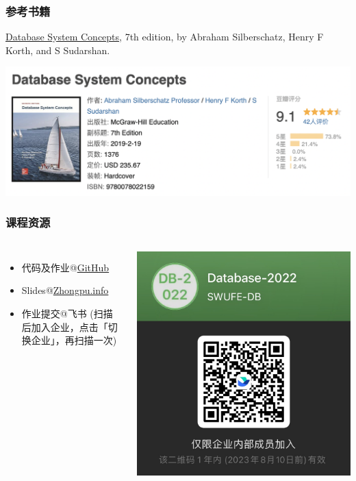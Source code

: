 \documentclass[aspectratio=169, 14pt]{beamer}
\begin{document}
\begin{frame}
    \frametitle{参考书籍}
    \href{https://book.douban.com/subject/30345517/}{Database System Concepts}, 7th edition, by Abraham Silberschatz, Henry F Korth, and S Sudarshan.
    \begin{center}
        \includegraphics[height=.5\paperheight]{image/dsc-book}
    \end{center}
\end{frame}

\begin{frame}
    \frametitle{课程资源}
    \begin{columns}
        \begin{itemize}
            \item 代码及作业@\href{https://github.com/ChenZhongPu/db-swufe}{GitHub}
            \item Slides@\href{https://zhongpu.info/teaching/cs205-2022-fall/}{Zhongpu.info}
            \item 作业提交@飞书 (\small 扫描后加入企业，点击\alert{「切换企业」}，再扫描一次)
        \end{itemize}
        \includegraphics[height=0.85\paperheight]{image/feishu}
    \end{columns}
\end{frame}
\end{document}
